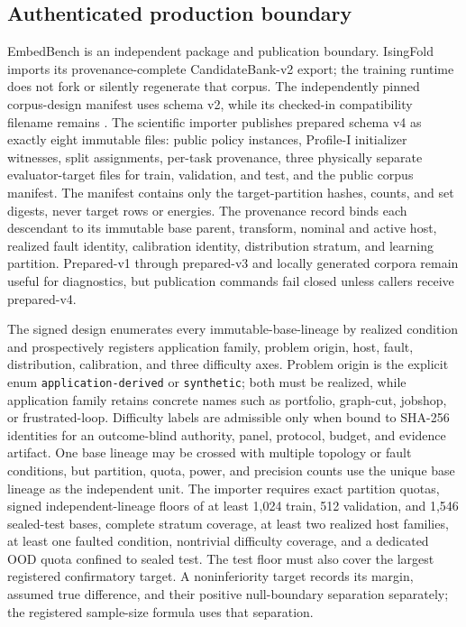\subsection{Authenticated production boundary}
EmbedBench is an independent package and publication boundary. IsingFold imports its provenance-complete CandidateBank-v2 export; the training runtime does not fork or silently regenerate that corpus. The independently pinned corpus-design manifest uses schema v2, while its checked-in compatibility filename remains . The scientific importer publishes prepared schema v4 as exactly eight immutable files: public policy instances, Profile-I initializer witnesses, split assignments, per-task provenance, three physically separate evaluator-target files for train, validation, and test, and the public corpus manifest. The manifest contains only the target-partition hashes, counts, and set digests, never target rows or energies. The provenance record binds each descendant to its immutable base parent, transform, nominal and active host, realized fault identity, calibration identity, distribution stratum, and learning partition. Prepared-v1 through prepared-v3 and locally generated corpora remain useful for diagnostics, but publication commands fail closed unless callers receive prepared-v4.

The signed design enumerates every immutable-base-lineage by realized condition and prospectively registers application family, problem origin, host, fault, distribution, calibration, and three difficulty axes. Problem origin is the explicit enum \texttt{application-derived} or \texttt{synthetic}; both must be realized, while application family retains concrete names such as portfolio, graph-cut, jobshop, or frustrated-loop. Difficulty labels are admissible only when bound to SHA-256 identities for an outcome-blind authority, panel, protocol, budget, and evidence artifact. One base lineage may be crossed with multiple topology or fault conditions, but partition, quota, power, and precision counts use the unique base lineage as the independent unit. The importer requires exact partition quotas, signed independent-lineage floors of at least 1,024 train, 512 validation, and 1,546 sealed-test bases, complete stratum coverage, at least two realized host families, at least one faulted condition, nontrivial difficulty coverage, and a dedicated OOD quota confined to sealed test. The test floor must also cover the largest registered confirmatory target. A noninferiority target records its margin, assumed true difference, and their positive null-boundary separation separately; the registered sample-size formula uses that separation.

